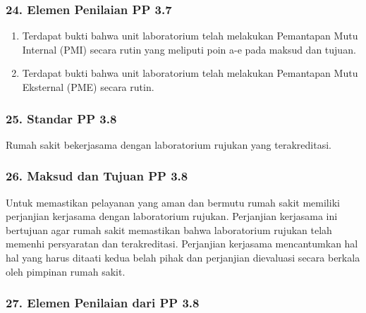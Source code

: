 \documentclass[
]{book}
\providecommand{\tightlist}{%
  \setlength{\itemsep}{0pt}\setlength{\parskip}{0pt}}
\begin{document}
\hypertarget{elemen-penilaian-pp-3.7}{%
\subsubsection*{24. Elemen Penilaian PP 3.7}\label{elemen-penilaian-pp-3.7}}

\begin{enumerate}
\def\labelenumi{\alph{enumi}.}
\tightlist
\item
  Terdapat bukti bahwa unit laboratorium telah melakukan Pemantapan Mutu Internal (PMI) secara rutin yang meliputi poin a-e pada maksud dan tujuan.
\item
  Terdapat bukti bahwa unit laboratorium telah melakukan Pemantapan Mutu Eksternal (PME) secara rutin.
\end{enumerate}

\hypertarget{standar-pp-3.8}{%
\subsubsection*{25. Standar PP 3.8}\label{standar-pp-3.8}}

Rumah sakit bekerjasama dengan laboratorium rujukan yang terakreditasi.

\hypertarget{maksud-dan-tujuan-pp-3.8}{%
\subsubsection*{26. Maksud dan Tujuan PP 3.8}\label{maksud-dan-tujuan-pp-3.8}}

Untuk memastikan pelayanan yang aman dan bermutu rumah sakit memiliki perjanjian kerjasama dengan laboratorium rujukan. Perjanjian kerjasama ini bertujuan agar rumah sakit memastikan bahwa laboratorium rujukan telah memenhi persyaratan dan terakreditasi. Perjanjian kerjasama mencantumkan hal hal yang harus ditaati kedua belah pihak dan perjanjian dievaluasi secara berkala oleh pimpinan rumah sakit.

\hypertarget{elemen-penilaian-dari-pp-3.8}{%
\subsubsection*{27. Elemen Penilaian dari PP 3.8}\label{elemen-penilaian-dari-pp-3.8}}
\end{document}
